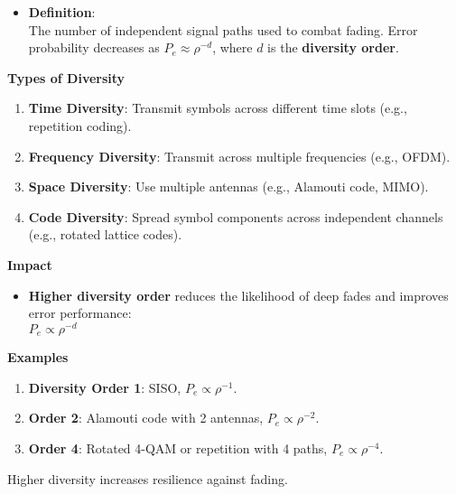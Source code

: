 \documentclass[11pt]{article}
\providecommand{\tightlist}{%
      \setlength{\itemsep}{0pt}\setlength{\parskip}{0pt}}
\begin{document}
\begin{itemize}
\tightlist
\item
  \textbf{Definition}:\\
  The number of independent signal paths used to combat fading. Error
  probability decreases as \(P_e \approx \rho^{-d}\), where \(d\) is the
  \textbf{diversity order}.
\end{itemize}

\textbf{Types of Diversity}

\begin{enumerate}
\def\labelenumi{\arabic{enumi}.}
\tightlist
\item
  \textbf{Time Diversity}: Transmit symbols across different time slots
  (e.g., repetition coding).\\
\item
  \textbf{Frequency Diversity}: Transmit across multiple frequencies
  (e.g., OFDM).\\
\item
  \textbf{Space Diversity}: Use multiple antennas (e.g., Alamouti code,
  MIMO).\\
\item
  \textbf{Code Diversity}: Spread symbol components across independent
  channels (e.g., rotated lattice codes).
\end{enumerate}

\textbf{Impact}

\begin{itemize}
\tightlist
\item
  \textbf{Higher diversity order} reduces the likelihood of deep fades
  and improves error performance:\\
  \(P_e \propto \rho^{-d}\)
\end{itemize}

\textbf{Examples}

\begin{enumerate}
\def\labelenumi{\arabic{enumi}.}
\tightlist
\item
  \textbf{Diversity Order 1}: SISO, \(P_e \propto \rho^{-1}\).\\
\item
  \textbf{Order 2}: Alamouti code with 2 antennas,
  \(P_e \propto \rho^{-2}\).\\
\item
  \textbf{Order 4}: Rotated 4-QAM or repetition with 4 paths,
  \(P_e \propto \rho^{-4}\).
\end{enumerate}

Higher diversity increases resilience against fading.
\end{document}
